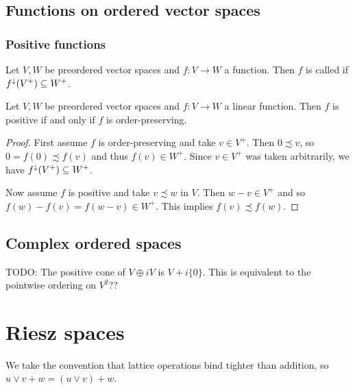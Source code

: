 \subsection{Functions on ordered vector spaces}
\subsubsection{Positive functions}
\begin{definition}
Let $V,W$ be preordered vector spaces and $f: V\to W$ a function. Then $f$ is called  if $f^\downarrow(V^+) \subseteq W^+$.
\end{definition}

\begin{lemma} \label{positiveLinearFunctionIsotone}
Let $V,W$ be preordered vector spaces and $f: V\to W$ a linear function. Then $f$ is positive \textup{if and only if} $f$ is order-preserving.
\end{lemma}
\begin{proof}
First assume $f$ is order-preserving and take $v\in V^+$. Then $0\precsim v$, so $0=f(0) \precsim f(v)$ and thus $f(v)\in W^+$. Since $v\in V^+$ was taken arbitrarily, we have $f^\downarrow(V^+) \subseteq W^+$.

Now assume $f$ is positive and take $v\precsim w$ in $V$. Then $w-v \in V^+$ and so $f(w) - f(v) = f(w-v) \in W^+$. This implies $f(v)\precsim f(w)$.
\end{proof}

\subsection{Complex ordered spaces}
TODO: The positive cone of $V\oplus iV$ is $V+i\{0\}$. This is equivalent to the pointwise ordering on $V^2$??


\section{Riesz spaces}

We take the convention that lattice operations bind tighter than addition, so $u\vee v + w = (u\vee v) + w$.

